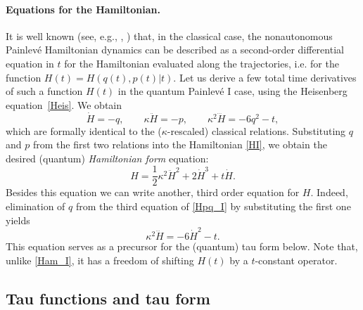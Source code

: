 \documentclass[12pt,a4paper]{article}
\numberwithin{equation}{section}
\begin{document}
\paragraph{Equations for the Hamiltonian.}
It is well known (see, e.g., \cite{JM81}, \cite{Forrester_book}) that, in the classical case, the nonautonomous Painlev\'e Hamiltonian dynamics can be described as a second-order differential equation in $t$ for the Hamiltonian evaluated along the trajectories, i.e. for the function $H(t)=H(q(t),p(t)|t)$. Let us derive a few total time derivatives of such a function $H(t)$ in the quantum Painlev\'e I case, using the Heisenberg equation~\eqref{Heis}. We obtain 
\begin{equation}\label{Hpq_I}
\dot{H}=-q, \qquad \kappa\ddot{H}=-p, \qquad \kappa^2\dddot{H}=-6q^2-t,   
\end{equation}
which are formally identical to the ($\kappa$-rescaled) classical relations. Substituting $q$ and $p$ from the first two relations into the Hamiltonian \eqref{HI}, we obtain the desired (quantum) \textit{Hamiltonian form} equation:
\begin{equation}\label{Ham_I}
H=\frac12\kappa^2\ddot{H}^2+2\dot{H}^3+t\dot{H}.
\end{equation}
Besides this equation we can write another, third order equation for $H$. Indeed, elimination of $q$ from the third equation of \eqref{Hpq_I} by substituting the first one yields
\begin{equation}\label{prec_I}
\kappa^2\dddot{H}=-6\dot{H}^2-t.
\end{equation}
This equation serves as a precursor for the (quantum) tau form below. Note that, unlike \eqref{Ham_I}, it has a freedom of shifting $H(t)$ by a $t$-constant operator.

\subsection{Tau functions and tau form}
\label{ssec:tau_I}
\end{document}

